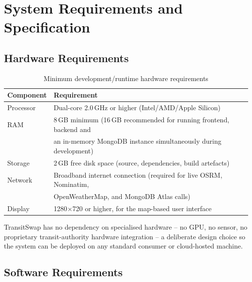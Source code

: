 \documentclass[12pt,a4paper]{report}
\begin{document}
\chapter{System Requirements and Specification}

\section{Hardware Requirements}

\begin{table}[H]
\centering
\caption{Minimum development/runtime hardware requirements}
\begin{tabular}{@{}ll@{}}
\toprule
\textbf{Component} & \textbf{Requirement} \\
\midrule
Processor & Dual-core 2.0\,GHz or higher (Intel/AMD/Apple Silicon) \\
RAM & 8\,GB minimum (16\,GB recommended for running frontend, backend and \\
    & an in-memory MongoDB instance simultaneously during development) \\
Storage & 2\,GB free disk space (source, dependencies, build artefacts) \\
Network & Broadband internet connection (required for live OSRM, Nominatim, \\
        & OpenWeatherMap, and MongoDB Atlas calls) \\
Display & 1280$\times$720 or higher, for the map-based user interface \\
\bottomrule
\end{tabular}
\end{table}

TransitSwap has no dependency on specialised hardware -- no GPU, no sensor, no proprietary
transit-authority hardware integration -- a deliberate design choice so the system can be deployed
on any standard consumer or cloud-hosted machine.

\section{Software Requirements}
\end{document}
